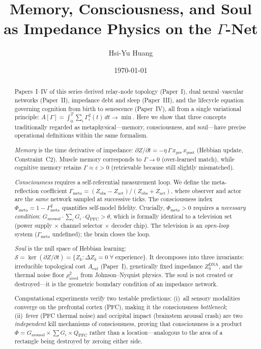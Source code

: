 \documentclass[aps,pre,twocolumn,superscriptaddress,floatfix]{revtex4-2}
\newcommand{\Gmeta}{\Gamma_{\text{meta}}}
\newcommand{\Phimeta}{\Phi_{\text{meta}}}
\newcommand{\Zarousal}{G_{\text{arousal}}}
\newcommand{\QPFC}{Q_{\text{PFC}}}
\newcommand{\Acut}{A_{\text{cut}}}
\begin{document}
\title{Memory, Consciousness, and Soul\\
as Impedance Physics on the $\Gamma$-Net}

\author{Hsi-Yu Huang}

\date{\today}

\begin{abstract}
Papers~I--IV of this series derived relay-node topology
(Paper~I), dual neural--vascular networks (Paper~II),
impedance debt and sleep (Paper~III), and the lifecycle
equation governing cognition from birth to senescence
(Paper~IV), all from a single variational principle:
$A[\Gamma]=\int_0^T\!\sum_i\Gamma_i^2(t)\,dt\to\min$.
Here we show that three concepts traditionally regarded as
metaphysical---memory, consciousness, and soul---have
precise operational definitions within the same formalism.

\emph{Memory} is the time derivative of impedance:
$\partial Z/\partial t=-\eta\,\Gamma\,x_{\text{pre}}\,x_{\text{post}}$
(Hebbian update, Constraint~C2).
Muscle memory corresponds to $\Gamma\to 0$ (over-learned match),
while cognitive memory retains $\Gamma\approx\varepsilon>0$
(retrievable because still slightly mismatched).

\emph{Consciousness} requires a self-referential measurement
loop.  We define the meta-reflection coefficient
$\Gmeta=(Z_{\text{obs}}-Z_{\text{act}})/(Z_{\text{obs}}+Z_{\text{act}})$,
where observer and actor are the \emph{same} network sampled at
successive ticks.  The consciousness index
$\Phimeta=1-\Gmeta^2$ quantifies self-model fidelity.
Crucially, $\Phimeta>0$ requires a \emph{necessary condition}:
$\Zarousal\cdot\sum_i G_i\cdot\QPFC>\theta$,
which is formally identical to a television set
(power supply $\times$ channel selector $\times$ decoder chip).
The television is an \emph{open-loop} system ($\Gmeta$ undefined);
the brain closes the loop.

\emph{Soul} is the null space of Hebbian learning:
$\mathcal{S}=\ker(\partial Z/\partial t)
=\{Z_k:\Delta Z_k=0\;\forall\;\text{experience}\}$.
It decomposes into three invariants:
irreducible topological cost $\Acut$ (Paper~I),
genetically fixed impedance $Z_0^{\text{DNA}}$, and
the thermal noise floor $\rho_{\text{irred}}^2$ from
Johnson--Nyquist physics.
The soul is not created or destroyed---it is the geometric
boundary condition of an impedance network.

Computational experiments verify two testable predictions:
(i)~all sensory modalities converge on the prefrontal cortex
(PFC), making it the consciousness \emph{bottleneck};
(ii)~fever (PFC thermal noise) and occipital impact
(brainstem arousal crash) are two \emph{independent}
kill mechanisms of consciousness, proving that consciousness
is a product $\Phi=\Zarousal\times\sum G_i\times\QPFC$
rather than a location---analogous to the area of a
rectangle being destroyed by zeroing either side.


\end{abstract}
\end{document}
